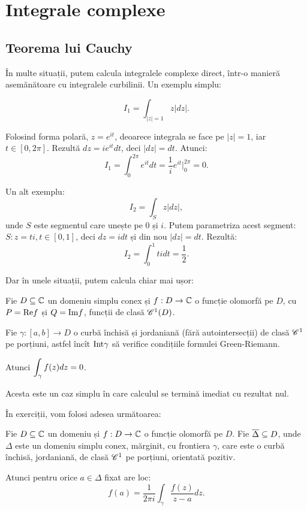 
\chapter{Integrale complexe}

\section{Teorema lui Cauchy}
\indent\indent În multe situații, putem calcula integralele complexe direct,
într-o manieră asemănătoare cu integralele curbilinii. Un exemplu simplu:

\[
  I_1 = \int_{|z| = 1} z |dz|.
\]

Folosind forma polară, $ z = e^{it} $, deoarece integrala se face pe
$ |z| = 1 $, iar $ t \in [0, 2\pi] $. Rezultă $ dz = ie^{it} dt $,
deci $ |dz| = dt $. Atunci:
\[
  I_1 = \int_0^{2\pi} e^{it} dt = \dfrac{1}{i} e^{it} \Big|_0^{2\pi} = 0.
\]

Un alt exemplu:
\[
  I_2 = \int_S z |dz|,
\]
unde $ S $ este segmentul care unește pe $ 0 $ și $ i $. Putem parametriza
acest segment: $S : z = ti, t \in [0,1] $, deci $ dz = idt $ și din nou
$ |dz| = dt $. Rezultă:
\[
  I_2 = \int_0^1 tidt = \dfrac{1}{2}.
\]

Dar în unele situații, putem calcula chiar mai ușor:
\begin{theorem}[Cauchy]\label{thm:tcauchy} 
  Fie $ D \subseteq \mathbb{C} $ un domeniu simplu conex și $ f : D \to \mathbb{C} $ o funcție
  olomorfă pe $ D $, cu $ P = \mathrm{Re}f $ și $ Q = \mathrm{Im} f $, funcții de clasă
  $ \mathscr{C}^1(D) $.

  Fie $ \gamma : [a, b] \to D $ o curbă închisă și jordaniană (fără autointersecții)
  de clasă $ \mathscr{C}^1 $ pe porțiuni, astfel încît $ \mathrm{Int}\gamma $ să verifice
  condițiile formulei Green-Riemann.

  Atunci $ \displaystyle\int_\gamma f(z) dz = 0 $.
\end{theorem}

Acesta este un caz simplu în care calculul se termină imediat cu rezultat nul.

În exerciții, vom folosi adesea următoarea:
\begin{theorem}\label{thm:fintcauchy}
  Fie $ D \subseteq \mathbb{C} $ un domeniu și $ f : D \to \mathbb{C} $ o funcție olomorfă pe $ D $.
  Fie $ \overline{\Delta} \subseteq D $, unde $ \Delta $ este un domeniu simplu conex,
  mărginit, cu frontiera $ \gamma $, care este o curbă închisă, jordaniană, de
  clasă $ \mathscr{C}^1 $ pe porțiuni, orientată pozitiv.

  Atunci pentru orice $ a \in \Delta $ fixat are loc:
  \[
    f(a) = \dfrac{1}{2 \pi i} \int_\gamma \dfrac{f(z)}{z - a} dz.
  \]
\end{theorem}

